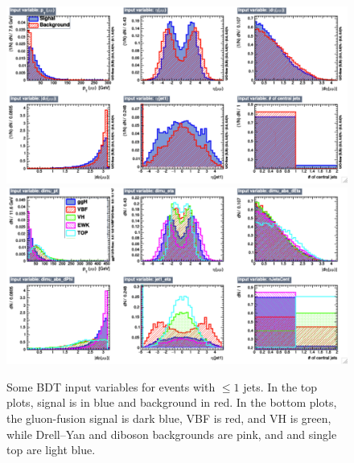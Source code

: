 \begin{figure}
  \includegraphics[width=1.0\linewidth]{figures/bdt_training/BDT_in_le1j_all_A.pdf}
  \includegraphics[width=1.0\linewidth]{figures/bdt_training/BDT_in_le1j_sep_A.pdf}
  \caption{Some BDT input variables for events with $\le 1$ jets.
           In the top plots, signal is in blue and background in red.
           In the bottom plots, the gluon-fusion signal is dark blue, VBF is red, and VH is green,
           while Drell--Yan and diboson backgrounds are pink, and \ttbar and single top are light blue.}
  \label{fig:BDT_in_le1j_A}
\end{figure}

